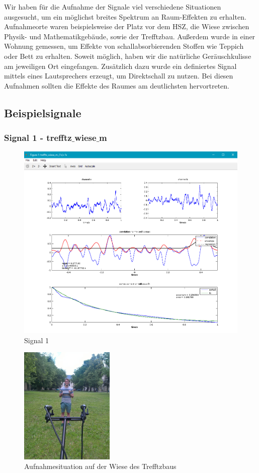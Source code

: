 Wir haben für die Aufnahme der Signale viel verschiedene Situationen ausgesucht, um ein möglichst breites Spektrum an Raum-Effekten zu erhalten. Aufnahmeorte waren beispielsweise der Platz vor dem HSZ, die Wiese zwischen Physik- und Mathematikgebäude, sowie der Trefftzbau. Außerdem wurde in einer Wohnung gemessen, um Effekte von schallabsorbierenden Stoffen wie Teppich oder Bett zu erhalten. Soweit möglich, haben wir die natürliche Geräuschkulisse am jeweiligen Ort eingefangen. Zusätzlich dazu wurde ein definiertes Signal mittels eines Lautsprechers erzeugt, um Direktschall zu nutzen. Bei diesen Aufnahmen sollten die Effekte des Raumes am deutlichsten hervortreten.
\subsection{Beispielsignale}
\subsubsection{Signal 1 - trefftz$\_$wiese$\_$m}
\begin{figure}[ht!]
  \centering
  \includegraphics[scale=0.64]{img/trefftz_wiese_m}
  \caption{Signal 1}
  \label{figure2}
\end{figure}
\begin{figure}[ht!]
  \centering
  \includegraphics[width=0.4\textwidth]{img/wiese}
  \caption{Aufnahmesituation auf der Wiese des Trefftzbaus}
  \label{figure4}
\end{figure}
